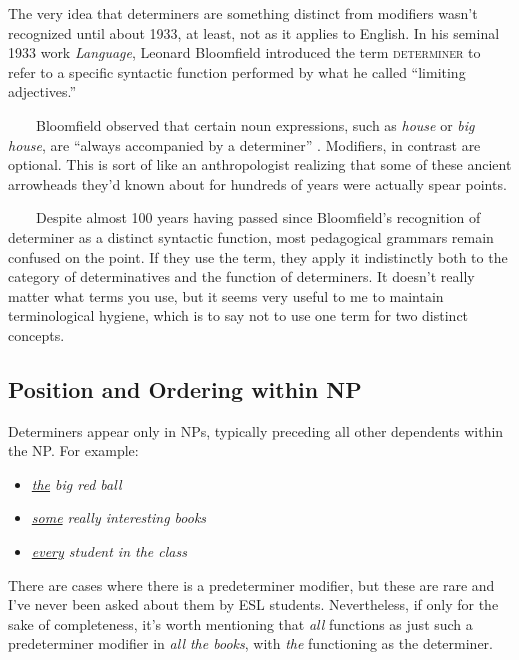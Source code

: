 \begin{tcolorbox}[title=Determiners: A brief history\is{determiner (Det)!history of the term}, colback=white]

The very idea that determiners are something distinct from modifiers wasn't recognized until about 1933, at least, not as it applies to English. In his seminal 1933 work \textit{Language}, Leonard Bloomfield introduced the term \textsc{determiner} to refer to a specific syntactic function performed by what he called ``limiting adjectives.''

~~~~Bloomfield observed that certain noun expressions, such as \textit{house} or \textit{big house}, are ``always accompanied by a determiner'' \citep[203]{bloomfield1984language}. Modifiers, in contrast are optional. This is sort of like an anthropologist realizing that some of these ancient arrowheads they'd known about for hundreds of years were actually spear points.

~~~~Despite almost 100 years having passed since Bloomfield's recognition of determiner as a distinct syntactic function, most pedagogical grammars remain confused on the point. If they use the term, they apply it indistinctly both to the category of determinatives and the function of determiners. It doesn't really matter what terms you use, but it seems very useful to me to maintain terminological hygiene, which is to say not to use one term for two distinct concepts.

\end{tcolorbox}

\subsection{Position and Ordering within NP}

Determiners appear only in NPs, typically preceding all other dependents within the NP. For example:

\begin{itemize}[noitemsep]
   \item \textit{\uline{the} big red ball}
   \item \textit{\uline{some} really interesting books}
   \item \textit{\uline{every} student in the class}
\end{itemize}

There are cases where there is a predeterminer modifier, but these are rare and I've never been asked about them by ESL students. Nevertheless, if only for the sake of completeness, it's worth mentioning that \textit{all} functions as just such a predeterminer modifier in \textit{all the books}, with \textit{the} functioning as the determiner.


